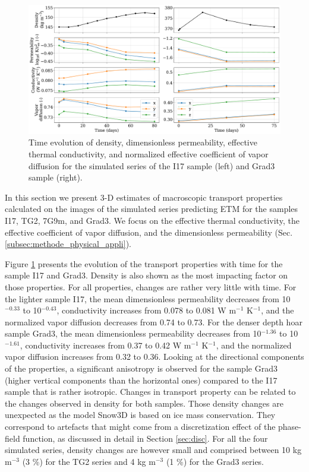 \documentclass[draft,ms]{agujournal2019}
\begin{document}
\begin{figure}
    \centering
    \includegraphics[width=\linewidth]{Figures/4images_transport_temps_court.pdf}
    \caption{Time evolution of density, dimensionless permeability, effective thermal conductivity, and normalized effective coefficient of vapor diffusion for the simulated series of the I17 sample (left) and Grad3 sample (right). }
    \label{fig:transport_temps} 
\end{figure}

In this section we present 3-D estimates of macroscopic transport properties calculated on the images of the simulated series predicting ETM for the samples I17, TG2, 7G9m, and Grad3. We focus on the effective thermal conductivity, the effective coefficient of vapor diffusion, and the dimensionless permeability (Sec. \ref{subsec:methode_physical_appli}).


Figure \ref{fig:transport_temps} presents the evolution of the transport properties with time for the sample I17 and Grad3. Density is also shown as the most impacting factor on those properties.
For all properties, changes are rather very little with time.
For the lighter sample I17, the mean dimensionless permeability decreases from 10$^{-0.33}$ to 10$^{-0.43}$, conductivity increases from 0.078 to 0.081 W m$^{-1}$ K$^{-1}$, and the normalized vapor diffusion decreases from 0.74 to 0.73. For the denser depth hoar sample Grad3, the mean dimensionless permeability decreases from 10$^{-1.36}$ to 10$^{-1.61}$, conductivity increases from 0.37 to 0.42 W m$^{-1}$ K$^{-1}$, and the normalized vapor diffusion increases from 0.32 to 0.36. Looking at the directional components of the properties, a significant anisotropy is observed for the sample Grad3 (higher vertical components than the horizontal ones) compared to the I17 sample that is rather isotropic.
Changes in transport property can be related to the changes observed in density for both samples. Those density changes are unexpected as the model Snow3D is based on ice mass conservation. They correspond to artefacts that might come from a discretization effect of the phase-field function, as discussed in detail in Section \ref{sec:disc}. For all the four simulated series, density changes are however small and comprised between 10 kg m$^{-3}$ (3 \%) for the TG2 series and 4 kg m$^{-3}$ (1 \%) for the Grad3 series.
\end{document}
